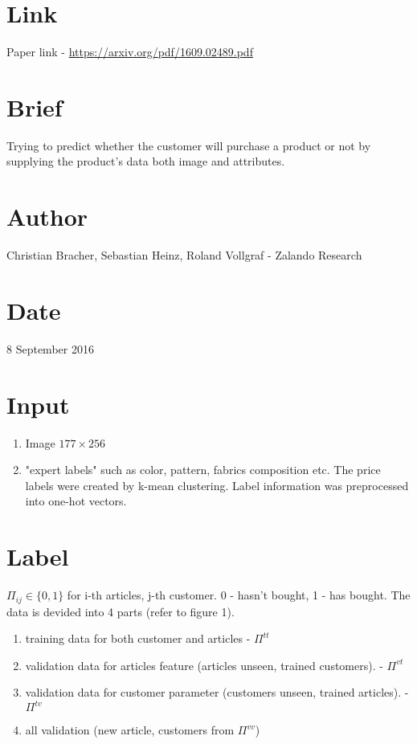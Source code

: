 \documentclass{article}
\begin{document}
\section*{Link}
Paper link - \url{https://arxiv.org/pdf/1609.02489.pdf}
\section*{Brief}
Trying to predict whether the customer will purchase a product or not by supplying the product's data both image and attributes.
\section*{Author}
Christian Bracher, Sebastian Heinz, Roland Vollgraf - Zalando Research
\section*{Date}
8 September 2016
\section*{Input}
\begin{enumerate}
\item Image $177\times256$
\item "expert labels" such as color, pattern, fabrics composition etc. The price labels were created by k-mean clustering. Label information was preprocessed into one-hot vectors.
\end{enumerate}
\section*{Label}
$\Pi_{ij} \in \{0,1\}$ for i-th articles, j-th customer. 0 - hasn't bought, 1 - has bought. The data is devided into 4 parts (refer to figure 1).
\begin{enumerate}
\item training data for both customer and articles - $\Pi^{tt}$
\item validation data for articles feature (articles unseen, trained customers). - $\Pi^{vt}$
\item validation data for customer parameter (customers unseen, trained articles). - $\Pi^{tv}$
\item all validation (new article, customers from $\Pi^{vv}$)
\end{enumerate}
\end{document}
